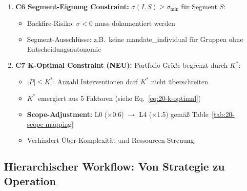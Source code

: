 \begin{enumerate}
\item \textbf{C6 Segment-Eignung Constraint:} $\sigma(I, S) \geq \sigma_{\min}$ für Segment $S$:
\begin{itemize}[nosep]
\item Backfire-Risiko: $\sigma < 0$ muss dokumentiert werden
\item Segment-Ausschlüsse: z.B.\ keine mandate\_individual für Gruppen ohne Entscheidungsautonomie
\end{itemize}

\item \textbf{C7 K-Optimal Constraint (NEU):} Portfolio-Größe begrenzt durch $K^*$:
\begin{itemize}[nosep]
\item $|P| \leq K^*$: Anzahl Interventionen darf $K^*$ nicht überschreiten
\item $K^*$ emergiert aus 5 Faktoren (siehe Eq.~\ref{eq:20-k-optimal})
\item \textbf{Scope-Adjustment:} L0 (×0.6) $\to$ L4 (×1.5) gemäß Table~\ref{tab:20-scope-mapping}
\item Verhindert Über-Komplexität und Ressourcen-Streuung
\end{itemize}
\end{enumerate}

\subsection{Hierarchischer Workflow: Von Strategie zu Operation}
\label{sec:20-hierarchical-workflow}

